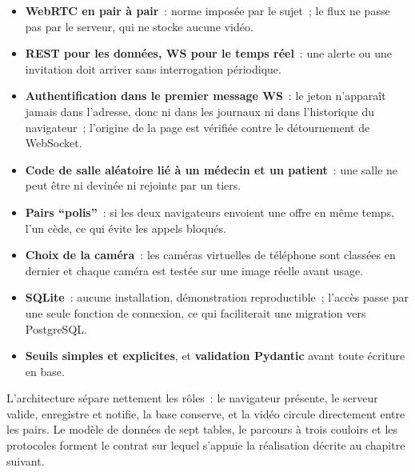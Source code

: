 \begin{itemize}
  \item \textbf{WebRTC en pair à pair}~: norme imposée par le sujet~; le flux ne passe pas par le serveur, qui ne stocke aucune vidéo.
  \item \textbf{\ac{REST} pour les données, \ac{WS} pour le temps réel}~: une alerte ou une invitation doit arriver sans interrogation périodique.
  \item \textbf{Authentification dans le premier message \ac{WS}}~: le jeton n'apparaît jamais dans l'adresse, donc ni dans les journaux ni dans l'historique du navigateur~; l'origine de la page est vérifiée contre le détournement de WebSocket.
  \item \textbf{Code de salle aléatoire lié à un médecin et un patient}~: une salle ne peut être ni devinée ni rejointe par un tiers.
  \item \textbf{Pairs \enquote{polis}}~: si les deux navigateurs envoient une offre en même temps, l'un cède, ce qui évite les appels bloqués.
  \item \textbf{Choix de la caméra}~: les caméras virtuelles de téléphone sont classées en dernier et chaque caméra est testée sur une image réelle avant usage.
  \item \textbf{SQLite}~: aucune installation, démonstration reproductible~; l'accès passe par une seule fonction de connexion, ce qui faciliterait une migration vers PostgreSQL.
  \item \textbf{Seuils simples et explicites}, et \textbf{validation Pydantic} avant toute écriture en base.
\end{itemize}

\conclchap

L'architecture sépare nettement les rôles~: le navigateur présente, le serveur valide, enregistre et notifie, la base conserve, et la vidéo circule directement entre les pairs. Le modèle de données de sept tables, le parcours à trois couloirs et les protocoles forment le contrat sur lequel s'appuie la réalisation décrite au chapitre suivant.
